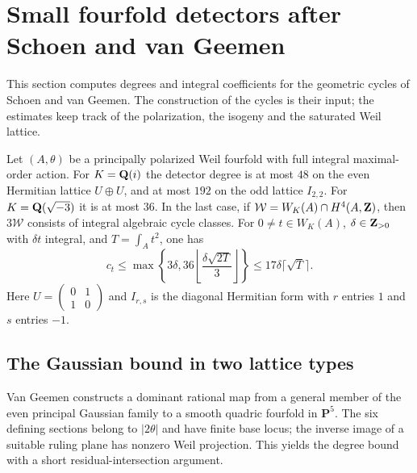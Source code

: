 \section{Small fourfold detectors after Schoen and van Geemen}
\label{sec:small}
This section computes degrees and integral coefficients for the geometric cycles of Schoen and van Geemen. The construction of the cycles is their input; the estimates keep track of the polarization, the isogeny and the saturated Weil lattice.

\begin{theorem}\label{thm:small-detectors}
Let $(A,\theta)$ be a principally polarized Weil fourfold with full integral maximal-order action. For $K=\mathbf Q(i)$ the detector degree is at most $48$ on the even Hermitian lattice $U\oplus U$, and at most $192$ on the odd lattice $I_{2,2}$. For $K=\mathbf Q(\sqrt{-3})$ it is at most $36$. In the last case, if $\mathcal W=W_K(A)\cap H^4(A,\mathbf Z)$, then $3\mathcal W$ consists of integral algebraic cycle classes. For $0\ne t\in W_K(A)$, $\delta\in\mathbf Z_{>0}$ with $\delta t$ integral, and $T=\int_A t^2$, one has
\begin{equation}\label{eq:eisenstein-cost}
 c_t\leq\max\left\{3\delta,
 36\left\lfloor\frac{\delta\sqrt{2T}}3\right\rfloor\right\}
 \leq17\delta\lceil\sqrt T\rceil.
\end{equation}
Here $U=\left(\begin{smallmatrix}0&1\\1&0\end{smallmatrix}\right)$ and $I_{r,s}$ is the diagonal Hermitian form with $r$ entries $1$ and $s$ entries $-1$.
\end{theorem}

\subsection{The Gaussian bound in two lattice types}

Van Geemen \cite[Proposition~3.6 and Theorem~3.7, pp.~623--625]{vG96} constructs a dominant rational map from a general member of the even principal Gaussian family to a smooth quadric fourfold in $\mathbf P^5$. The six defining sections belong to $|2\theta|$ and have finite base locus; the inverse image of a suitable ruling plane has nonzero Weil projection. This yields the degree bound with a short residual-intersection argument.

